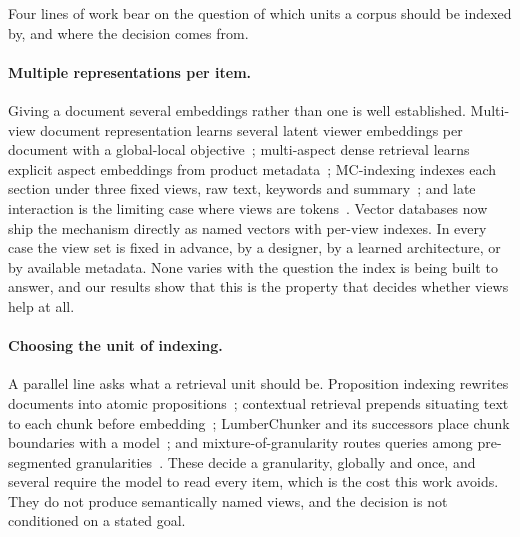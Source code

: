 Four lines of work bear on the question of which units a corpus should be indexed
by, and where the decision comes from.

\paragraph{Multiple representations per item.}
Giving a document several embeddings rather than one is well established.
Multi-view document representation learns several latent viewer embeddings per
document with a global-local objective~\cite{zhang2022multiview}; multi-aspect
dense retrieval learns explicit aspect embeddings from product
metadata~\cite{kong2022madral}; MC-indexing indexes each section under three
fixed views, raw text, keywords and summary~\cite{dong2024mcindexing}; and late
interaction is the limiting case where views are tokens~\cite{khattab2020colbert}.
Vector databases now ship the mechanism directly as named vectors with per-view
indexes. In every case the view set is fixed in advance, by a designer, by a
learned architecture, or by available metadata. None varies with the question the
index is being built to answer, and our results show that this is the property
that decides whether views help at all.

\paragraph{Choosing the unit of indexing.}
A parallel line asks what a retrieval unit should be. Proposition indexing
rewrites documents into atomic propositions~\cite{chen2024densex}; contextual
retrieval prepends situating text to each chunk before
embedding~\cite{anthropic2024contextual}; LumberChunker and its successors place
chunk boundaries with a model~\cite{duarte2024lumberchunker}; and
mixture-of-granularity routes queries among pre-segmented
granularities~\cite{zhong2024mog}. These decide a granularity, globally and once,
and several require the model to read every item, which is the cost this work
avoids. They do not produce semantically named views, and the decision is not
conditioned on a stated goal.

